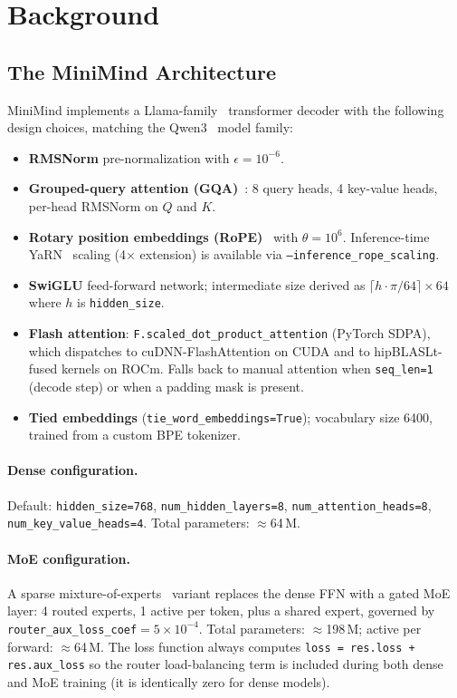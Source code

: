 \section{Background}
\label{sec:background}

\subsection{The MiniMind Architecture}
\label{sec:background:arch}

MiniMind implements a Llama-family~\citep{touvron2023llama} transformer decoder
with the following design choices, matching the Qwen3~\citep{qwen3} model family:

\begin{itemize}[leftmargin=*]
  \item \textbf{RMSNorm} pre-normalization with $\epsilon = 10^{-6}$.
  \item \textbf{Grouped-query attention (GQA)}~\citep{ainslie2023gqa}: 8 query
    heads, 4 key-value heads, per-head RMSNorm on $Q$ and $K$.
  \item \textbf{Rotary position embeddings (RoPE)}~\citep{su2024roformer} with
    $\theta = 10^6$.  Inference-time YaRN~\citep{peng2023yarn} scaling (4$\times$
    extension) is available via \texttt{--inference\_rope\_scaling}.
  \item \textbf{SwiGLU} feed-forward network; intermediate size derived as
    $\lceil h \cdot \pi / 64 \rceil \times 64$ where $h$ is \texttt{hidden\_size}.
  \item \textbf{Flash attention}: \texttt{F.scaled\_dot\_product\_attention}
    (PyTorch SDPA), which dispatches to cuDNN-FlashAttention on CUDA and to
    hipBLASLt-fused kernels on ROCm.  Falls back to manual attention when
    \texttt{seq\_len=1} (decode step) or when a padding mask is present.
  \item \textbf{Tied embeddings} (\texttt{tie\_word\_embeddings=True});
    vocabulary size 6400, trained from a custom BPE tokenizer.
\end{itemize}

\paragraph{Dense configuration.}
Default: \texttt{hidden\_size=768}, \texttt{num\_hidden\_layers=8},
\texttt{num\_attention\_heads=8}, \texttt{num\_key\_value\_heads=4}.
Total parameters: $\approx$64\,M.

\paragraph{MoE configuration.}
A sparse mixture-of-experts~\citep{shazeer2017outrageously} variant replaces
the dense FFN with a gated MoE layer: 4 routed experts, 1 active per token, plus
a shared expert, governed by
\texttt{router\_aux\_loss\_coef}$= 5 \times 10^{-4}$.  Total parameters:
$\approx$198\,M; active per forward: $\approx$64\,M.  The loss function always
computes \texttt{loss = res.loss + res.aux\_loss} so the router
load-balancing term is included during both dense and MoE training
(it is identically zero for dense models).

